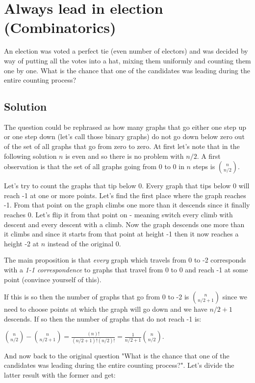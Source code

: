 \section{Always lead in election (Combinatorics)}
An election was voted a perfect tie (even number of electors) and was decided by way of putting
all the votes into a hat, mixing them uniformly and counting them one by one. What is the chance
that one of the candidates was leading during the entire counting process?

\subsection{Solution}
The question could be rephrased as how many graphs that go either one step up or one step down (let's call those binary graphs) do not go down below zero out of the set of all graphs that go from zero to zero. At first let's note that in the following solution $n$ is even and so there is no problem with $n/2$. A first observation is that the set of all graphs going from 0 to 0 in $n$ steps is ${n \choose n/2}$.

Let's try to count the graphs that tip below 0. Every graph that tips below 0 will reach -1 at one or more points. Let's find the first place where the graph reaches -1. From that point on the graph climbs one more than it descends since it finally reaches 0. Let's flip it from that point on - meaning switch every climb with descent and every descent with a climb. Now the graph descends one more than it climbs and since it starts from that point at height -1 then it now reaches a height -2 at $n$ instead of the original 0.

The main proposition is that \emph{every} graph which travels from 0 to -2 corresponds with a \emph{1-1 correspondence} to graphs that travel from 0 to 0 and reach -1 at some point (convince yourself
of this).

If this is so then the number of graphs that go from 0 to -2 is ${n \choose n/2+1}$ since we need to
choose points at which the graph will go down and we have $n/2+1$ descends. If so then the number of
graphs that do not reach -1 is:

${n \choose n/2} - {n \choose n/2+1} = \frac{(n)!}{(n/2+1)!(n/2)!} = \frac{1}{n/2+1}{n \choose n/2}$.

And now back to the original question "What is the chance that one of the candidates was leading during the entire counting process?". Let's divide the latter result with the former and get:


